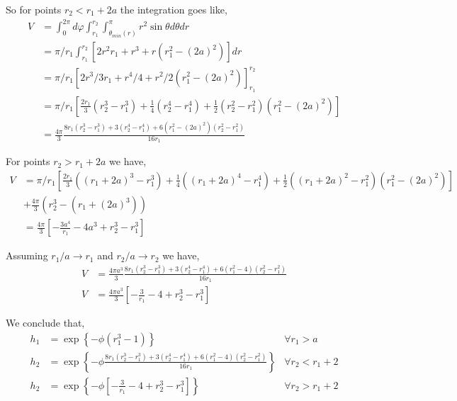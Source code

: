 So for points $r_2 <r_1 +2a$ the integration goes like, 
\begin{align}
    V 
    &= 
    \int_0^{2\pi}
    d\varphi
    \int_{r_1}^{r_2}
    \int_{\theta_{min}(r)}^{\pi}
    r^2
    \sin\theta
    d\theta 
    dr\\
    &= 
    \pi /r_1
    \int_{r_1}^{r_2} 
    [2r^2r_1 +  
        r^3 
        + r(r_1^2
        - (2a)^2)
    ]
    dr\\
    &= 
    \pi /r_1
    [2r^3/3r_1 
        +  r^4/4
        + r^2/2 (r_1^2 - (2a)^2)
    ]_{r_1}^{r_2} \\
    &= 
    \pi /r_1
    [\frac{2r_1}{3}(r_2^3-r_1^3) 
    + \frac{1}{4} (r_2^4-r_1^4)
        + \frac{1}{2}(r_2^2 - r_1^2) (r_1^2 - (2a)^2)]\\
    & = \frac{4\pi}{3}
    \frac{ 
     8 r_{1} \left(r_{2}^{3} - r_{1}^{3}\right) 
    + 3 (r_{2}^{4} - r_{1}^{4})
    + 6  \left(r_{1}^{2} - (2 a)^{2} \right) \left(r_{2}^{2} - r_{1}^{2}\right)}{16 r_{1}}
\end{align}

For points $r_2 > r_1 +2a$ we have, 
\begin{align}
    V &= 
    \pi /r_1
    [\frac{2r_1}{3}((r_1 + 2a)^3-r_1^3) 
    + \frac{1}{4} ((r_1 + 2a)^4-r_1^4)
        + \frac{1}{2}((r_1 + 2a)^2 - r_1^2) (r_1^2 - (2a)^2)]
    \\
    &+\frac{4\pi}{3}(r_2^3 - (r_1+(2a)^3))\\
    &
    =
    \frac{4\pi}{3}\left[
        -\frac{3a^4}{r_1}
        - 4 a^3 
        + r_2^3
        -r_1^3
    \right]
\end{align}

Assuming $r_1/a \to r_1$ and $r_2/a \to r_2$ we have, 
\begin{align}
    V 
    &= 
    \frac{4\pi a^3}{3}
    \frac{ 
     8 r_{1} \left(r_{2}^{3} - r_{1}^{3}\right) 
    + 3 (r_{2}^{4} - r_{1}^{4})
    + 6  \left(r_{1}^{2} - 4 \right) \left(r_{2}^{2} - r_{1}^{2}\right)}{16 r_{1}}
    \\
    V 
    &= 
    \frac{4\pi a^3}{3}\left[
        -\frac{3}{r_1}
        - 4 
        + r_2^3
        -r_1^3
    \right]
\end{align}



We conclude that, 
\begin{align}
    h_1 &= \exp\left\{-\phi (r_1^3 - 1)\right\}& \forall r_1 > a\\
    h_2 &= \exp\left\{-\phi 
        \frac{ 
        8 r_{1} \left(r_{2}^{3} - r_{1}^{3}\right) 
       + 3 (r_{2}^{4} - r_{1}^{4})
       + 6  \left(r_{1}^{2} - 4 \right) \left(r_{2}^{2} - r_{1}^{2}\right)}{16 r_{1}}
    \right\} &\forall  r_2 < r_1 + 2\\ 
    h_2 &= \exp\left\{-\phi 
    \left[
        -\frac{3}{r_1}
        - 4 
        + r_2^3
        -r_1^3
    \right]
    \right\} &\forall  r_2 > r_1 + 2 
\end{align}

